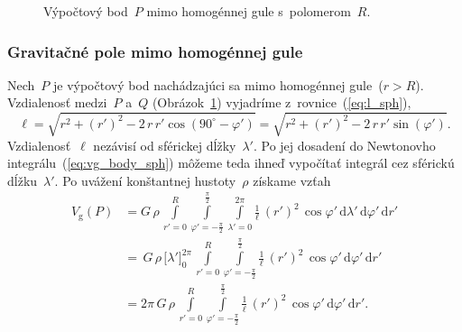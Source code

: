 \documentclass[a4paper, 12pt]{book}
\newcommand{\diff}{\mathrm d}
\newcommand{\gidx}{\mathrm g}
\begin{document}
\begin{figure}
\centering

\caption{Výpočtový bod~$P$ mimo homogénnej gule s~polomerom~$R$.}
\label{fig:homogeneous_ball_out}
\end{figure}

\subsubsection{Gravitačné pole mimo homogénnej gule}

Nech~$P$ je výpočtový bod nachádzajúci sa mimo homogénnej gule~($r > R$).  
Vzdialenosť medzi~$P$ a~$Q$ (Obrázok~\ref{fig:homogeneous_ball_out}) vyjadríme 
z~rovnice~(\ref{eq:l_sph}),
%
\begin{equation}
\label{eq:l_sph_ball}
\ell = \sqrt{r^2 + (r')^2 - 2 \, r \, r' \cos(90^{\circ} - \varphi')} 
= \sqrt{r^2 + (r')^2 - 2 \, r \, r' \sin(\varphi')}{.}
\end{equation}
%
Vzdialenosť~$\ell$ nezávisí od sférickej dĺžky~$\lambda'$.  Po jej dosadení do 
Newtonovho integrálu~(\ref{eq:vg_body_sph}) môžeme teda ihneď vypočítať 
integrál cez sférickú dĺžku~$\lambda'$.  Po uvážení konštantnej hustoty~$\rho$ 
získame vzťah
%
\begin{equation}
\label{eq:vg_ball_sph}
\begin{split}
V_\gidx(P) &= G \, \rho \, \int\limits_{r' = 0}^{R} \int\limits_{\varphi' 
= -\frac{\pi}{2}}^{\frac{\pi}{2}} \int\limits_{\lambda' = 0}^{2\pi} 
\frac{1}{\ell} \, (r')^2 \, \cos\varphi' \, \diff \lambda' \, \diff \varphi' \, 
\diff r'\\
%
&=\, G \, \rho \, \big[ \lambda' \big]_{0}^{2\pi} \, \int\limits_{r' = 0}^{R} 
\int\limits_{\varphi' = -\frac{\pi}{2}}^{\frac{\pi}{2}} \frac{1}{\ell} \, 
(r')^2 \, \cos\varphi' \, \diff \varphi' \, \diff r'\\
%
&=2\pi \, G \, \rho \, \int\limits_{r' = 0}^{R} \int\limits_{\varphi' 
= -\frac{\pi}{2}}^{\frac{\pi}{2}} \frac{1}{\ell} \, (r')^2 \, \cos\varphi' \, 
\diff \varphi' \, \diff r'{.}
\end{split}
\end{equation}
\end{document}
